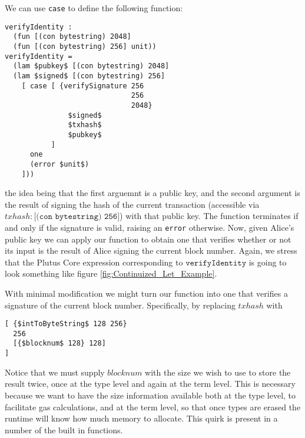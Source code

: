 \documentclass[../main.tex]{subfiles}
\begin{document}
We can use \texttt{case} to define the following function:
\begin{lstlisting}[basicstyle=\ttfamily,mathescape]
verifyIdentity :
  (fun [(con bytestring) 2048]
  (fun [(con bytestring) 256] unit))
verifyIdentity =
  (lam $pubkey$ [(con bytestring) 2048]                  
  (lam $signed$ [(con bytestring) 256]
    [ case [ {verifySignature 256 
                              256
                              2048}
               $signed$
               $txhash$
               $pubkey$
           ]
      one
      (error $unit$)
    ]))
\end{lstlisting}
the idea being that the first arguemnt is a public key, and the second argument is the result of signing the hash of the current transaction (accessible via $txhash : \texttt{[(con bytestring) 256]}$) with that public key. The function terminates if and only if the signature is valid, raising an \texttt{error} otherwise. Now, given Alice's public key we can apply our function to obtain one that verifies whether or not its input is the result of Alice signing the current block number. Again, we stress that the Plutus Core expression corresponding to $\texttt{verifyIdentity}$ is going to look something like figure \ref{fig:Continuized_Let_Example}.

With minimal modification we might turn our function into one that verifies a signature of the current block number. Specifically, by replacing $txhash$ with
\begin{lstlisting}[basicstyle=\ttfamily,mathescape]
[ {$intToByteString$ 128 256}
  256
  [{$blocknum$ 128} 128]
]
\end{lstlisting}
Notice that we must supply $blocknum$ with the size we wish to use to store the result twice, once at the type level and again at the term level. This is necessary because we want to have the size information available both at the type level, to facilitate gas calculations, and at the term level, so that once types are erased the runtime will know how much memory to allocate. This quirk is present in a number of the built in functions. 
\end{document}
